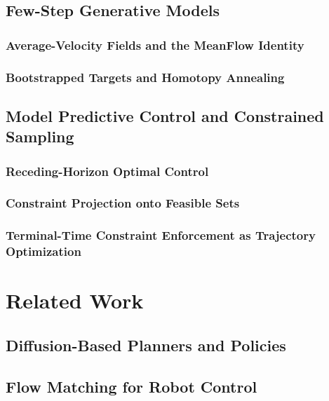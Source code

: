 \documentclass[headsepline,footsepline,footinclude=false,oneside,fontsize=11pt,paper=a4,listof=totoc,bibliography=totoc]{scrbook}
\begin{document}
\section{Few-Step Generative Models}\label{sec:bg:fewstep}
\subsection{Average-Velocity Fields and the MeanFlow Identity}\label{sec:bg:fewstep:meanflow}
\subsection{Bootstrapped Targets and Homotopy Annealing}\label{sec:bg:fewstep:alphaflow}

\section{Model Predictive Control and Constrained Sampling}\label{sec:bg:mpc}
\subsection{Receding-Horizon Optimal Control}\label{sec:bg:mpc:mpc}
\subsection{Constraint Projection onto Feasible Sets}\label{sec:bg:mpc:projection}
\subsection{Terminal-Time Constraint Enforcement as Trajectory Optimization}\label{sec:bg:mpc:trajopt}

\chapter{Related Work}\label{ch:related}

\section{Diffusion-Based Planners and Policies}\label{sec:rel:diffusion}
\section{Flow Matching for Robot Control}\label{sec:rel:flow}
\end{document}
